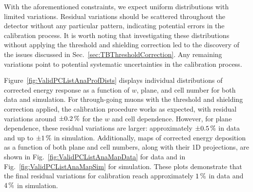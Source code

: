 With the aforementioned constraints, we expect uniform distributions with limited variations. Residual variations should be scattered throughout the detector without any particular pattern, indicating potential errors in the calibration process. It is worth noting that investigating these distributions without applying the threshold and shielding correction led to the discovery of the issues discussed in Sec.~\ref{sec:TBThresholdCorrection}. Any remaining variations point to potential systematic uncertainties in the calibration process.

Figure~\ref{fig:ValidPCListAnaProfDists} displays individual distributions of corrected energy response as a function of $w$, plane, and cell number for both data and simulation. For through-going muons with the threshold and shielding correction applied, the calibration procedure works as expected, with residual variations around $\pm\unit[0.2]{\%}$ for the $w$ and cell dependence. However, for plane dependence, these residual variations are larger: approximately $\pm\unit[0.5]{\%}$ in data and up to $\pm\unit[1]{\%}$ in simulation. Additionally, maps of corrected energy deposition as a function of both plane and cell numbers, along with their 1D projections, are shown in Fig.~\ref{fig:ValidPCListAnaMapData} for data and in Fig.~\ref{fig:ValidPCListAnaMapSim} for simulation. These plots demonstrate that the final residual variations for calibration reach approximately $\unit[1]{\%}$ in data and $\unit[4]{\%}$ in simulation.

